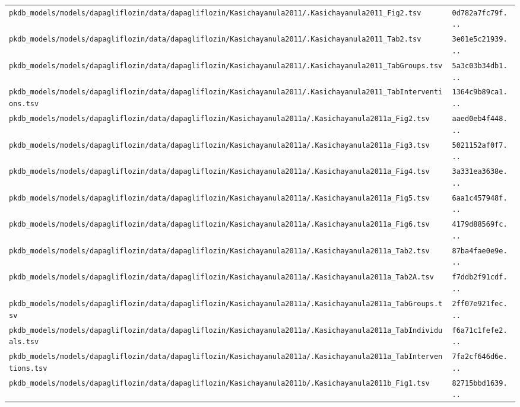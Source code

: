 \documentclass{article}
\begin{document}
\begin{longtable}{ll}
\texttt{pkdb\_models/models/dapagliflozin/data/dapagliflozin/Kasichayanula2011/.Kasichayanula2011\_Fig2.tsv} & \texttt{0d782a7fc79f...} \\
\texttt{pkdb\_models/models/dapagliflozin/data/dapagliflozin/Kasichayanula2011/.Kasichayanula2011\_Tab2.tsv} & \texttt{3e01e5c21939...} \\
\texttt{pkdb\_models/models/dapagliflozin/data/dapagliflozin/Kasichayanula2011/.Kasichayanula2011\_TabGroups.tsv} & \texttt{5a3c03b34db1...} \\
\texttt{pkdb\_models/models/dapagliflozin/data/dapagliflozin/Kasichayanula2011/.Kasichayanula2011\_TabInterventions.tsv} & \texttt{1364c9b89ca1...} \\
\texttt{pkdb\_models/models/dapagliflozin/data/dapagliflozin/Kasichayanula2011a/.Kasichayanula2011a\_Fig2.tsv} & \texttt{aaed0eb4f448...} \\
\texttt{pkdb\_models/models/dapagliflozin/data/dapagliflozin/Kasichayanula2011a/.Kasichayanula2011a\_Fig3.tsv} & \texttt{5021152af0f7...} \\
\texttt{pkdb\_models/models/dapagliflozin/data/dapagliflozin/Kasichayanula2011a/.Kasichayanula2011a\_Fig4.tsv} & \texttt{3a331ea3638e...} \\
\texttt{pkdb\_models/models/dapagliflozin/data/dapagliflozin/Kasichayanula2011a/.Kasichayanula2011a\_Fig5.tsv} & \texttt{6aa1c457948f...} \\
\texttt{pkdb\_models/models/dapagliflozin/data/dapagliflozin/Kasichayanula2011a/.Kasichayanula2011a\_Fig6.tsv} & \texttt{4179d88569fc...} \\
\texttt{pkdb\_models/models/dapagliflozin/data/dapagliflozin/Kasichayanula2011a/.Kasichayanula2011a\_Tab2.tsv} & \texttt{87ba4fae0e9e...} \\
\texttt{pkdb\_models/models/dapagliflozin/data/dapagliflozin/Kasichayanula2011a/.Kasichayanula2011a\_Tab2A.tsv} & \texttt{f7ddb2f91cdf...} \\
\texttt{pkdb\_models/models/dapagliflozin/data/dapagliflozin/Kasichayanula2011a/.Kasichayanula2011a\_TabGroups.tsv} & \texttt{2ff07e921fec...} \\
\texttt{pkdb\_models/models/dapagliflozin/data/dapagliflozin/Kasichayanula2011a/.Kasichayanula2011a\_TabIndividuals.tsv} & \texttt{f6a71c1fefe2...} \\
\texttt{pkdb\_models/models/dapagliflozin/data/dapagliflozin/Kasichayanula2011a/.Kasichayanula2011a\_TabInterventions.tsv} & \texttt{7fa2cf646d6e...} \\
\texttt{pkdb\_models/models/dapagliflozin/data/dapagliflozin/Kasichayanula2011b/.Kasichayanula2011b\_Fig1.tsv} & \texttt{82715bbd1639...} \\

\end{longtable}
\end{document}
